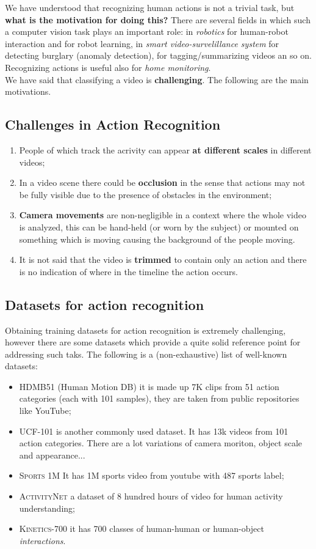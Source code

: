 We have understood that recognizing human actions is not a trivial task, but \textbf{what is the motivation for doing this?} There are several fields in which such a computer vision task plays an important role: in \textit{robotics} for human-robot interaction and for robot learning, in \textit{smart video-survelillance system} for detecting burglary (anomaly detection), for tagging/summarizing videos an so on. Recognizing actions is useful also for \textit{home monitoring}. \\
We have said that classifying a video is \textbf{challenging}. The following are the main motivations.

\subsection{Challenges in Action Recognition}
\begin{enumerate}
    \itemsep-0.2em
    \item People of which track the acrivity can appear \textbf{at different scales} in different videos; 
    \item In a video scene there could be \textbf{occlusion} in the sense that actions may not be fully visible due to the presence of obstacles in the environment; 
    \item \textbf{Camera movements} are non-negligible in a context where the whole video is analyzed, this can be hand-held (or worn by the subject) or mounted on something which is moving causing the background of the people moving.
    \item It is not said that the video is \textbf{trimmed} to contain only an action and there is no indication of where in the timeline the action occurs.
\end{enumerate}

\subsection{Datasets for action recognition}
Obtaining training datasets for action recognition is extremely challenging, however there are some datasets which provide a quite solid reference point for addressing such taks. The following is a (non-exhaustive) list of well-known datasets: 
\begin{itemize}
    \itemsep-0.2em
    \item \textsc{HDMB51} (Human Motion DB) it is made up 7K clips from 51 action categories (each with 101 samples), they are taken from public repositories like YouTube; 
    \item \textsc{UCF-101} is another commonly used dataset. It has 13k videos from 101 action categories. There are a lot variations of camera  moriton, object scale and appearance... 
    \item \textsc{Sports 1M} It has 1M sports video from youtube with 487 sports label; 
    \item \textsc{ActivityNet} a dataset of 8 hundred hours of video for human activity understanding; 
    \item \textsc{Kinetics-700} it has 700 classes of human-human or human-object \textit{interactions}.
\end{itemize} 

